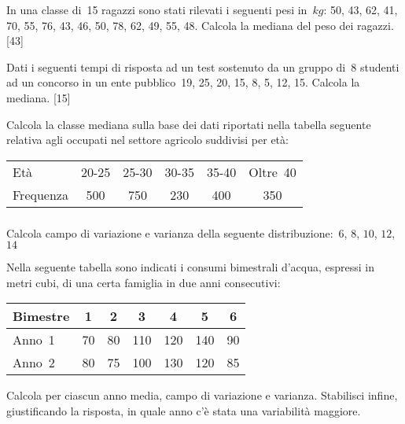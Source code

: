 \begin{esercizio}[\Ast]
\label{ese:A.31}
In una classe di~15 ragazzi sono stati rilevati i seguenti pesi 
in~$\unit{kg}$:
50, 43, 62, 41, 70, 55, 76, 43, 46, 50, 78, 62, 49, 55, 48.
Calcola la mediana del peso dei ragazzi.
\hfill [43]
\end{esercizio}

\begin{esercizio}[\Ast]
\label{ese:A.32}
Dati i seguenti tempi di risposta ad un test sostenuto da un gruppo di~8 
studenti ad un concorso
in un ente pubblico~19, 25, 20, 15, 8, 5, 12, 15. Calcola la mediana.
\hfill [15]
\end{esercizio}

\begin{esercizio}
\label{ese:A.33}
Calcola la classe mediana sulla base dei dati riportati nella tabella 
seguente relativa agli occupati nel settore agricolo suddivisi per età:
\begin{center}
 \begin{tabular}{l*{5}{c}}
\toprule
Età & 20-25 & 25-30 & 30-35 & 35-40 & Oltre~40\\
Frequenza & 500 & 750 & 230 & 400 & 350\\
\bottomrule
\end{tabular}
\end{center}
\end{esercizio}

\subsubsection*{}

\begin{esercizio}
\label{ese:A.34}
Calcola campo di variazione e varianza della seguente distribuzione:~$6$, 
$8$, $10$, $12$, $14$
\end{esercizio}

\begin{esercizio}
\label{ese:A.35}
Nella seguente tabella sono indicati i consumi bimestrali d'acqua, espressi 
in metri cubi, di una certa famiglia in due anni consecutivi:
\begin{center}
 \begin{tabular}{l*{6}{c}}
\toprule
Bimestre & 1 & 2 & 3 & 4 & 5 & 6 \\
\midrule
Anno~1 & 70 & 80 & 110 & 120 & 140 & 90 \\
Anno~2 & 80 & 75 & 100 & 130 & 120 & 85 \\
\bottomrule
\end{tabular}
\end{center}
Calcola per ciascun anno media, campo di variazione e varianza. Stabilisci 
infine, giustificando la risposta, in quale anno c'è stata una variabilità 
maggiore.
\end{esercizio}

